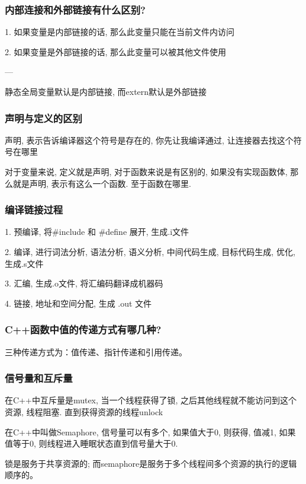 \subsubsection{内部连接和外部链接有什么区别?}
1. 如果变量是内部链接的话, 那么此变量只能在当前文件内访问 \par
2. 如果变量是外部链接的话, 那么此变量可以被其他文件使用 \par
---\par
静态全局变量默认是内部链接, 而extern默认是外部链接 \par
\subsubsection{声明与定义的区别}
声明, 表示告诉编译器这个符号是存在的, 你先让我编译通过, 让连接器去找这个符号在哪里 \par
对于变量来说, 定义就是声明, 对于函数来说是有区别的, 如果没有实现函数体, 那么就是声明, 表示有这么一个函数. 至于函数在哪里.
\subsubsection{编译链接过程}
1. 预编译, 将\#include 和 \#define 展开, 生成.i文件 \par
2. 编译, 进行词法分析, 语法分析, 语义分析, 中间代码生成, 目标代码生成, 优化, 生成.s文件 \par
3. 汇编, 生成.o文件, 将汇编码翻译成机器码 \par
4. 链接, 地址和空间分配, 生成 .out 文件 \par
\subsubsection{C++函数中值的传递方式有哪几种?}
三种传递方式为：值传递、指针传递和引用传递。
\subsubsection{信号量和互斥量}
在C++中互斥量是mutex, 当一个线程获得了锁, 之后其他线程就不能访问到这个资源, 线程阻塞. 直到获得资源的线程unlock \par
在C++中叫做Semaphore, 信号量可以有多个, 如果值大于0, 则获得, 值减1, 如果值等于0, 则线程进入睡眠状态直到信号量大于0. \par
锁是服务于共享资源的; 而semaphore是服务于多个线程间多个资源的执行的逻辑顺序的。\par
